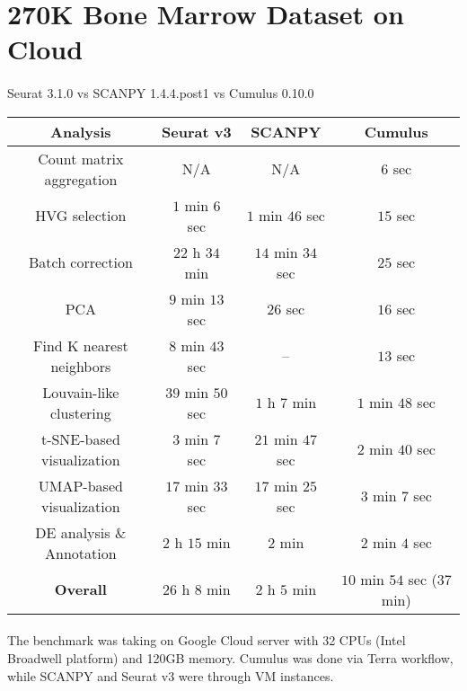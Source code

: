 \documentclass[10pt]{article}
\begin{document}
\section{270K Bone Marrow Dataset on Cloud}

\paragraph{}
Seurat 3.1.0 \qquad vs \qquad SCANPY 1.4.4.post1 \qquad vs \qquad Cumulus 0.10.0

\begin{table}[H]
	\centering
	\begin{tabular}{|c|c|c|c|}
		\hline
		Analysis & Seurat v3 & SCANPY & Cumulus\\
		\hline \hline
		Count matrix aggregation & N/A & N/A & $6$ sec   \\
		\hline
		HVG selection & $1$ min $6$ sec & $1$ min $46$ sec  & $15$ sec   \\
		\hline
		Batch correction & $22$ h $34$ min  & $14$ min $34$ sec  & $25$ sec  \\
		\hline
		PCA & $9$ min $13$ sec  & $26$ sec  & $16$ sec  \\
		\hline
		Find K nearest neighbors & $8$ min $43$ sec   & --   & $13$ sec  \\
		\hline
		Louvain-like clustering & $39$ min $50$ sec  & $1$ h $7$ min  & $1$ min $48$ sec   \\
		\hline
		t-SNE-based visualization & $3$ min $7$ sec  & $21$ min $47$ sec  & $2$ min $40$ sec  \\
		\hline
		UMAP-based visualization & $17$ min $33$ sec  & $17$ min $25$ sec   & $3$ min $7$ sec  \\
		\hline
		DE analysis \& Annotation & $2$ h $15$ min & $2$ min & $2$ min $4$ sec  \\
		\hline \hline
		\textbf{Overall} & $26$ h $8$ min & $2$ h $5$ min & $10$ min $54$ sec ($37$ min)  \\
		\hline
	\end{tabular}
\end{table}

\paragraph{}
The benchmark was taking on Google Cloud server with 32 CPUs (Intel Broadwell platform) and 120GB memory. Cumulus was done via Terra workflow, while SCANPY and Seurat v3 were through VM instances.
\end{document}

